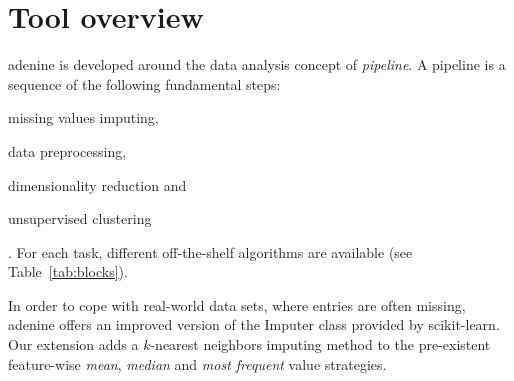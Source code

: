 \documentclass[twoside,11pt]{article}
\makeatletter
\newcommand{\ade}{{\sc adenine}\@\xspace}
\makeatother
\begin{document}
\section{Tool overview}\label{sec:implem}
\ade is developed around the data analysis concept of \emph{pipeline}. A pipeline is a sequence of the following fundamental steps:
\begin{enumerate*}[label=(\roman*)]
  \item missing values imputing,
  \item data preprocessing,
  \item dimensionality reduction and
  \item unsupervised clustering
\end{enumerate*}.
For each task, different off-the-shelf algorithms are available (see Table~\ref{tab:blocks}).%

  In order to cope with real-world data sets, where entries are often missing, \ade offers an improved version of the Imputer class provided by {\sc scikit-learn}. Our extension adds a $k$-nearest neighbors imputing method \citep{troyanskaya2001missing} to the pre-existent feature-wise \emph{mean}, \emph{median} and \emph{most frequent} value strategies.
\end{document}
